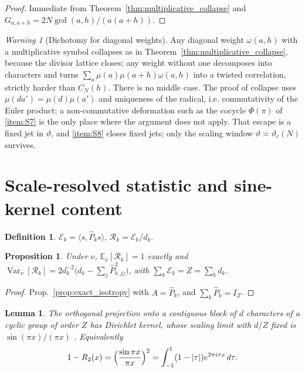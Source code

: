 \documentclass[11pt]{amsart}
\numberwithin{equation}{section}
\theoremstyle{plain}
\newtheorem{proposition}[theorem]{Proposition}
\newtheorem{lemma}[theorem]{Lemma}
\theoremstyle{definition}
\newtheorem{definition}[theorem]{Definition}
\theoremstyle{remark}
\newtheorem{warning}[theorem]{Warning}
\DeclareMathOperator{\Var}{Var}
\begin{document}
\begin{proof}
Immediate from Theorem~\ref{thm:multiplicative_collapse} and
$G_{a,a+h}=2N\gcd(a,h)/(a(a+h))$.
\end{proof}

\begin{warning}[Dichotomy for diagonal weights]
\label{warn:dichotomy}
Any diagonal weight $\omega(a,h)$ with a multiplicative symbol collapses
as in Theorem~\ref{thm:multiplicative_collapse}, because the divisor
lattice closes; any weight without one decomposes into characters and
turns $\sum_a\mu(a)\mu(a+h)\omega(a,h)$ into a twisted correlation,
strictly harder than $C_N(h)$. There is no middle case. The proof of
collapse uses $\mu(da')=\mu(d)\mu(a')$ and uniqueness of the radical,
i.e. commutativity of the Euler product; a non-commutative deformation
such as the cocycle $\Phi(\pi)$ of \ref{item:S7} is the only place where
the argument does not apply. That escape is a fixed jet in $\vartheta$,
and \ref{item:S8} closes fixed jets; only the scaling window
$\vartheta\asymp\vartheta_c(N)$ survives.
\end{warning}

\section{Scale-resolved statistic and sine-kernel content}
\label{sec:scale_resolved}

\begin{definition}
\label{def:scale_resolved_statistic}
$\mathcal E_k=\langle s,\widehat P_ks\rangle$,
$\mathcal R_k=\mathcal E_k/d_k$.
\end{definition}

\begin{proposition}
\label{prop:statistic_calibration}
Under $\nu$, $\mathbb E_\nu[\mathcal R_k]=1$ exactly and
$\Var_\nu[\mathcal R_k]
=2d_k^{-2}\bigl(d_k-\sum_j\widehat P_{k,jj}^2\bigr)$, with
$\sum_k\mathcal E_k=Z=\sum_kd_k$.
\end{proposition}

\begin{proof}
Prop.~\ref{prop:exact_isotropy} with $A=\widehat P_k$, and
$\sum_k\widehat P_k=I_Z$.
\end{proof}

\begin{lemma}
\label{lem:band_projector_sinc}
The orthogonal projection onto a contiguous block of $d$ characters of a
cyclic group of order $Z$ has Dirichlet kernel, whose scaling limit with
$d/Z$ fixed is $\sin(\pi x)/(\pi x)$ \cite{Mehta2004}. Equivalently
\begin{equation}
1-R_2(x)=\Bigl(\frac{\sin\pi x}{\pi x}\Bigr)^{2}
=\int_{-1}^{1}(1-|\tau|)e^{2\pi i\tau x}\,d\tau .
\label{eq:fejer_identity}
\end{equation}
\end{lemma}
\end{document}
